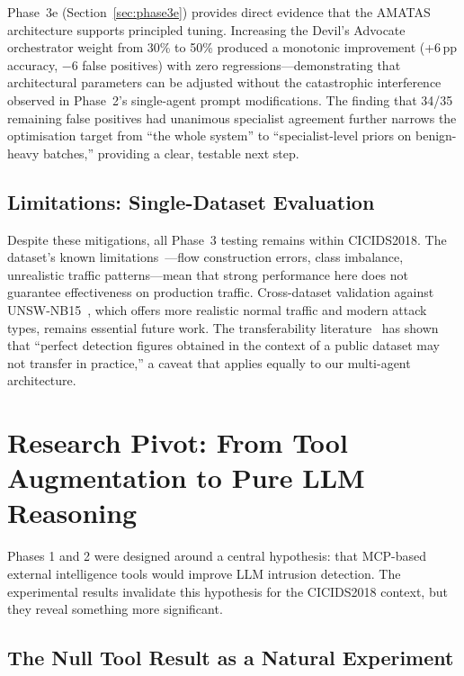 \documentclass[12pt, a4paper, oneside]{report}
\begin{document}
Phase~3e (Section~\ref{sec:phase3e}) provides direct evidence that the AMATAS
architecture supports principled tuning. Increasing the Devil's Advocate
orchestrator weight from 30\% to 50\% produced a monotonic improvement (+6\,pp
accuracy, $-$6 false positives) with zero regressions---demonstrating that
architectural parameters can be adjusted without the catastrophic interference
observed in Phase~2's single-agent prompt modifications. The finding that 34/35
remaining false positives had unanimous specialist agreement further narrows the
optimisation target from ``the whole system'' to ``specialist-level priors on
benign-heavy batches,'' providing a clear, testable next step.

\subsection{Limitations: Single-Dataset Evaluation}

Despite these mitigations, all Phase~3 testing remains within CICIDS2018.
The dataset's known limitations~\cite{engelen2021cicids, leevy2020survey,
kenyon2020datasets}---flow construction errors, class imbalance, unrealistic
traffic patterns---mean that strong performance here does not guarantee
effectiveness on production traffic. Cross-dataset validation against
UNSW-NB15~\cite{moustafa2015unswnb15}, which offers more realistic normal traffic
and modern attack types, remains essential future work. The transferability
literature~\cite{transferability2022} has shown that ``perfect detection figures
obtained in the context of a public dataset may not transfer in practice,'' a
caveat that applies equally to our multi-agent architecture.


\section{Research Pivot: From Tool Augmentation to Pure LLM Reasoning}
\label{sec:research-pivot}

Phases 1 and 2 were designed around a central hypothesis: that MCP-based
external intelligence tools would improve LLM intrusion detection. The
experimental results invalidate this hypothesis for the CICIDS2018 context,
but they reveal something more significant.

\subsection{The Null Tool Result as a Natural Experiment}
\end{document}
